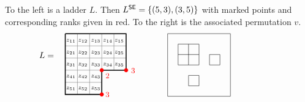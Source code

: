 \documentclass[12pt]{amsart}
\theoremstyle{definition}
\newenvironment{example}
  {\pushQED{\qed}\renewcommand{\qedsymbol}{$\diamondsuit$}\examplex}
  {\popQED\endexamplex}
\theoremstyle{remark}
\numberwithin{equation}{section}
\begin{document}
\begin{example}\label{ex:1sidelad}
To the left is a ladder $L$. Then $L^{\sf SE}=\{(5,3),(3,5)\}$ with marked points and corresponding ranks given in red. To the right is the associated permutation $v$.
\[\begin{picture}(280,65)
\put(0,35){$L=$}
\put(30,-10){\begin{tikzpicture}[scale=.5]
\draw[line width = .1ex, gray] (0,4) -- (5,4);
\draw[line width = .1ex, gray] (0,3) -- (5,3);
\draw[line width = .1ex, gray] (0,2) -- (3,2);
\draw[line width = .1ex, gray] (0,1) -- (3,1);

\draw[line width = .1ex, gray] (1,5) -- (1,0);
\draw[line width = .1ex, gray] (2,5) -- (2,0);
\draw[line width = .1ex, gray] (3,5) -- (3,2);
\draw[line width = .1ex, gray] (4,5) -- (4,2);



\draw[line width = .25ex] (0,5)--(5,5)--(5,2)--(3,2)--(3,0)--(0,0)--(0,5);
\filldraw[red] (5,2) circle (1ex);
\filldraw[red] (3,2) circle (1ex);
\filldraw[red] (3,0) circle (1ex);
\put(1,62){\scriptsize{$z_{11}$}}
\put(15,62){\scriptsize{$z_{12}$}}
\put(30,62){\scriptsize{$z_{13}$}}
\put(44,62){\scriptsize{$z_{14}$}}
\put(57.5,62){\scriptsize{$z_{15}$}}
\put(1,48){\scriptsize{$z_{21}$}}
\put(15,48){\scriptsize{$z_{22}$}}
\put(30,48){\scriptsize{$z_{23}$}}
\put(44,48){\scriptsize{$z_{24}$}}
\put(57.5,48){\scriptsize{$z_{25}$}}
\put(1,34){\scriptsize{$z_{31}$}}
\put(15,34){\scriptsize{$z_{32}$}}
\put(30,34){\scriptsize{$z_{33}$}}
\put(44,34){\scriptsize{$z_{34}$}}
\put(57.5,34){\scriptsize{$z_{35}$}}
\put(1,20){\scriptsize{$z_{41}$}}
\put(15,20){\scriptsize{$z_{42}$}}
\put(30,20){\scriptsize{$z_{43}$}}
\put(1,6){\scriptsize{$z_{51}$}}
\put(15,6){\scriptsize{$z_{52}$}}
\put(30,6){\scriptsize{$z_{53}$}}
\put(77,25){\small{$\textcolor{red}3$}}
\put(47,19){\small{$\textcolor{red}2$}}
\put(47,-3){\small{$\textcolor{red}3$}}
\end{tikzpicture}}
\put(150,-10){\begin{tikzpicture}[scale=.43]
\draw (0,0) rectangle (6,6);

\draw (1,5) rectangle (3,3);
\draw[line width = .1ex] (1,4) -- (3,4);
\draw[line width = .1ex] (2,3) -- (2,5);

\draw (4,4) rectangle (5,3);
\draw (2,1) rectangle (3,2);


\end{tikzpicture}}
\end{picture}\]
\end{example}
\end{document}

